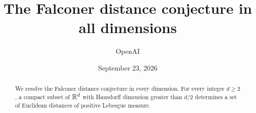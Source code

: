\documentclass[11pt,reqno]{amsart}
\title[The Falconer distance conjecture]{The Falconer distance conjecture in all dimensions}
\author{OpenAI}
\date{September 23, 2026}
\begin{document}
\begin{abstract}
We resolve the Falconer distance conjecture in every dimension. For every
integer \(d\ge2\), a compact subset of \(\mathbb R^d\) with Hausdorff dimension
greater than \(d/2\) determines a set of Euclidean distances of positive
Lebesgue measure.
\end{abstract}
\maketitle
\begingroup
\fontsize{10}{11}\selectfont
\tableofcontents
\endgroup













\end{document}
